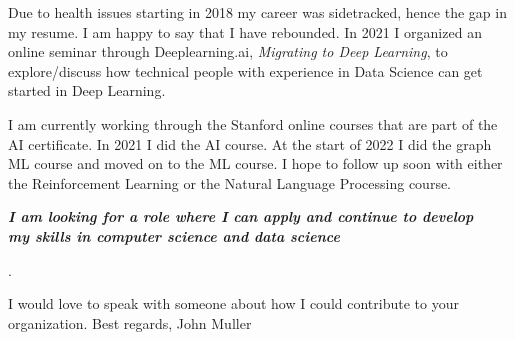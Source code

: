 \documentclass{article}
\begin{document}
\vspace{0.1in}
Due to health issues starting in 2018 my career was sidetracked, hence the gap in my resume.
I am happy to say that I have rebounded. In 2021 I organized an online seminar through Deeplearning.ai, \emph{Migrating to Deep Learning},
to explore/discuss how technical people with experience in Data Science can get started in Deep Learning.


I am currently working through the Stanford online courses that are part of the AI certificate.  In 2021 I did the AI course.  
At the start of 2022 I did the graph ML course and moved on to the ML course.  I hope to follow up soon with either the Reinforcement Learning or the Natural Language Processing course.

\vspace{0.1in}
\begin{center}
\textbf{\emph{I am  looking for a role where I can apply and  continue to develop \\
my skills in computer science and data science}}
\end{center}.
\vspace{0.1in}

\noindent I would love to speak with someone about how I could contribute to your organization.
Best regards,
John Muller
\end{document}
